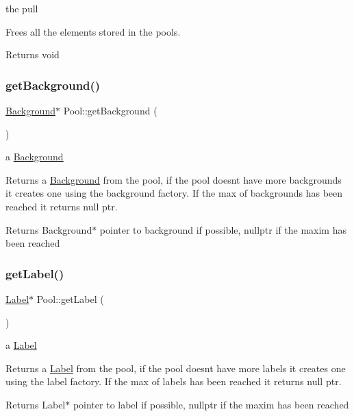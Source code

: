 the pull

Frees all the elements stored in the pools.

\begin{DoxyReturn}{Returns}
void 
\end{DoxyReturn}
\mbox{\label{class_pool_a367c875efe93a27fea4bcaf0ed281abd}} 
\subsubsection{\texorpdfstring{get\+Background()}{getBackground()}}
{\footnotesize\ttfamily \hyperlink{class_background}{Background}$\ast$ Pool\+::get\+Background (\begin{DoxyParamCaption}{ }\end{DoxyParamCaption})}

a \hyperlink{class_background}{Background}

Returns a \hyperlink{class_background}{Background} from the pool, if the pool doesn\textquotesingle{}t have more backgrounds it creates one using the background factory. If the max of backgrounds has been reached it returns null ptr.

\begin{DoxyReturn}{Returns}
Background$\ast$ pointer to background if possible, nullptr if the maxim has been reached 
\end{DoxyReturn}
\mbox{\label{class_pool_a13ce02d7dbee29305a83dcdb22a01661}} 
\subsubsection{\texorpdfstring{get\+Label()}{getLabel()}}
{\footnotesize\ttfamily \hyperlink{class_label}{Label}$\ast$ Pool\+::get\+Label (\begin{DoxyParamCaption}{ }\end{DoxyParamCaption})}

a \hyperlink{class_label}{Label}

Returns a \hyperlink{class_label}{Label} from the pool, if the pool doesn\textquotesingle{}t have more labels it creates one using the label factory. If the max of labels has been reached it returns null ptr.

\begin{DoxyReturn}{Returns}
Label$\ast$ pointer to label if possible, nullptr if the maxim has been reached 
\end{DoxyReturn}
\mbox{\label{class_pool_a2ea49e227ce14fcb926d451f9f59e452}} 
